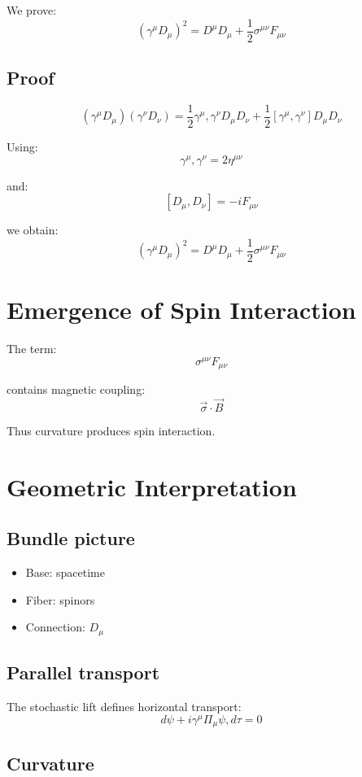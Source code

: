 \documentclass[11pt]{article}
\begin{document}
We prove:
\[
(\gamma^\mu D_\mu)^2 = D^\mu D_\mu + \frac{1}{2}\sigma^{\mu\nu} F_{\mu\nu}
\]

\subsection{Proof}

\[
(\gamma^\mu D_\mu)(\gamma^\nu D_\nu)
= \frac{1}{2}{\gamma^\mu,\gamma^\nu} D_\mu D_\nu
+ \frac{1}{2}[\gamma^\mu,\gamma^\nu] D_\mu D_\nu
  \]

Using:
\[
{\gamma^\mu,\gamma^\nu} = 2\eta^{\mu\nu}
\]

and:
\[
[D_\mu,D_\nu] = -i F_{\mu\nu}
\]

we obtain:
\[
(\gamma^\mu D_\mu)^2 = D^\mu D_\mu + \frac{1}{2}\sigma^{\mu\nu}F_{\mu\nu}
\]

\section{Emergence of Spin Interaction}

The term:
\[
\sigma^{\mu\nu}F_{\mu\nu}
\]

contains magnetic coupling:
\[
\vec{\sigma} \cdot \vec{B}
\]

Thus curvature produces spin interaction.

\section{Geometric Interpretation}

\subsection{Bundle picture}

\begin{itemize}
\item Base: spacetime
\item Fiber: spinors
\item Connection: $D_\mu$
\end{itemize}

\subsection{Parallel transport}

The stochastic lift defines horizontal transport:
\[
d\psi + i \gamma^\mu \Pi_\mu \psi, d\tau = 0
\]

\subsection{Curvature}
\end{document}
